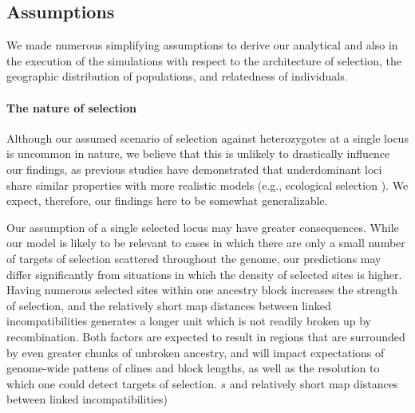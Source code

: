 \documentclass[11pt,letterpaper]{article}
\begin{document}




\subsection*{Assumptions}

We made numerous simplifying assumptions to derive our analytical and also in the execution of the simulations with respect to the architecture of selection, the geographic distribution of populations, and relatedness of individuals.

\paragraph{The nature of selection}
Although our assumed scenario of selection against heterozygotes at a single locus is uncommon in nature, we believe that this is unlikely to drastically influence our findings, as previous studies have demonstrated that underdominant loci share similar properties with more realistic models (e.g., ecological selection \citep{Barton1989,Barton1993}). 
We expect, therefore, our findings here to be somewhat generalizable. 

Our assumption of a single selected locus may have greater consequences. While our model is likely to be relevant to cases in which there are only a small number of targets of selection scattered throughout the genome, our predictions may differ significantly from situations in which the density of selected sites is higher. 
Having numerous selected sites within one ancestry block increases the strength of selection, and the relatively short map distances between linked incompatibilities generates a longer unit which is not readily broken up by recombination. Both factors are expected to result in regions that are surrounded by even greater chunks of unbroken ancestry, and will impact expectations of genome-wide pattens of clines and block lengths, as well as the resolution to which one could detect targets of selection. 
 $s$ and relatively short map distances between linked incompatibilities)
 
\end{document}

